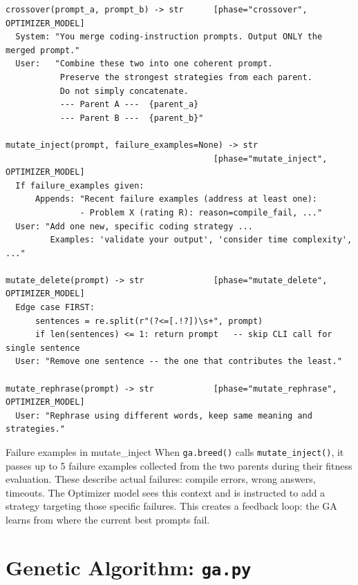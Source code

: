 \documentclass[11pt,a4paper]{report}
\newcommand{\pyfile}[1]{\texttt{#1}}
\newcommand{\fn}[1]{\texttt{#1}}
\begin{document}
\begin{lstlisting}[style=chain]
crossover(prompt_a, prompt_b) -> str      [phase="crossover", OPTIMIZER_MODEL]
  System: "You merge coding-instruction prompts. Output ONLY the merged prompt."
  User:   "Combine these two into one coherent prompt.
           Preserve the strongest strategies from each parent.
           Do not simply concatenate.
           --- Parent A ---  {parent_a}
           --- Parent B ---  {parent_b}"

mutate_inject(prompt, failure_examples=None) -> str
                                          [phase="mutate_inject", OPTIMIZER_MODEL]
  If failure_examples given:
      Appends: "Recent failure examples (address at least one):
               - Problem X (rating R): reason=compile_fail, ..."
  User: "Add one new, specific coding strategy ...
         Examples: 'validate your output', 'consider time complexity', ..."

mutate_delete(prompt) -> str              [phase="mutate_delete", OPTIMIZER_MODEL]
  Edge case FIRST:
      sentences = re.split(r"(?<=[.!?])\s+", prompt)
      if len(sentences) <= 1: return prompt   -- skip CLI call for single sentence
  User: "Remove one sentence -- the one that contributes the least."

mutate_rephrase(prompt) -> str            [phase="mutate_rephrase", OPTIMIZER_MODEL]
  User: "Rephrase using different words, keep same meaning and strategies."
\end{lstlisting}

\begin{conceptbox}{Failure examples in mutate\_inject}
When \fn{ga.breed()} calls \fn{mutate\_inject()}, it passes up to 5 failure examples
collected from the two parents during their fitness evaluation.  These describe actual
failures: compile errors, wrong answers, timeouts.  The Optimizer model sees this
context and is instructed to add a strategy targeting those specific failures.  This
creates a feedback loop: the GA learns from where the current best prompts fail.
\end{conceptbox}


\chapter{Genetic Algorithm: \pyfile{ga.py}}
\end{document}
